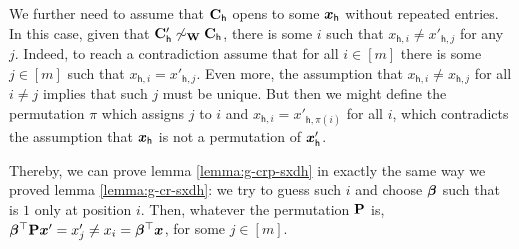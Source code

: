 We further need to assume that $\mathbf{{C}}_\mathsf{h}$ opens to some ${\boldsymbol{x}}_\mathsf{h}$ without repeated entries. In this case, given that $\mathbf{{C}}'_\mathsf{h}\not\sim_{\mathbf{{W}}}\mathbf{{C}}_\mathsf{h}$, there is some $i$ such that $x_{\mathsf{h},i}\neq x'_{\mathsf{h},j}$ for any $j$. Indeed, to reach a contradiction assume that for all $i\in[m]$ there is some $j\in[m]$ such that $x_{\mathsf{h},i}=x'_{\mathsf{h},j}$. Even more, the assumption that $x_{\mathsf{h},i}\neq x_{\mathsf{h},j}$ for all $i\neq j$ implies that such $j$ must be unique. But then we might define the permutation $\pi$ which assigns $j$ to $i$ and $x_{\mathsf{h},i} = x'_{\mathsf{h},\pi(i)}$ for all $i$, which contradicts the assumption that ${\boldsymbol{x}}_\mathsf{h}$ is not a permutation of ${\boldsymbol{x}}'_\mathsf{h}$.

Thereby, we can prove lemma \ref{lemma:g-crp-sxdh} in exactly the same way we proved lemma \ref{lemma:g-cr-sxdh}: we try to guess such $i$ and choose ${\boldsymbol{\beta}}$ such that is $1$ only at position $i$. Then, whatever the permutation $\mathbf{{P}}$ is, ${\boldsymbol{\beta}}^\top\mathbf{{P}}{\boldsymbol{x}}' = x'_j \neq x_i = {\boldsymbol{\beta}}^\top{\boldsymbol{x}}$, for some $j\in[m]$.

